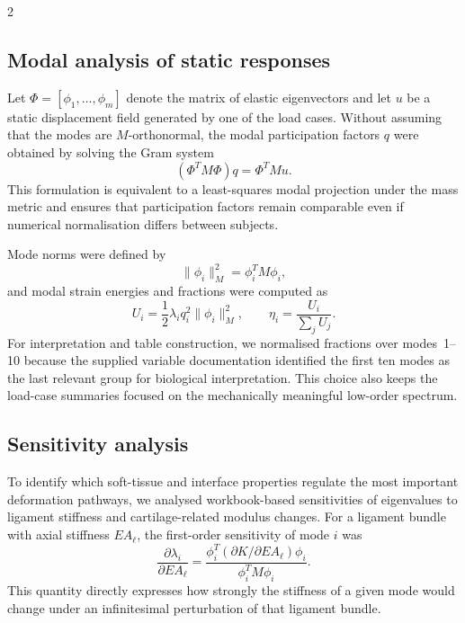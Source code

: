 \documentclass[openacc]{rsproca_new}
\begin{document}
\begin{multicols}{2}
\subsection{Modal analysis of static responses}

Let $\Phi=[\phi_{1},\ldots,\phi_{m}]$ denote the matrix of elastic eigenvectors and let $u$ be a static displacement field generated by one of the load cases. Without assuming that the modes are $M$-orthonormal, the modal participation factors $q$ were obtained by solving the Gram system
\begin{equation}
(\Phi^{T}M\Phi)q=\Phi^{T}Mu.
\end{equation}
This formulation is equivalent to a least-squares modal projection under the mass metric and ensures that participation factors remain comparable even if numerical normalisation differs between subjects.

Mode norms were defined by
\begin{equation}
\|\phi_{i}\|_{M}^{2}=\phi_{i}^{T}M\phi_{i},
\end{equation}
and modal strain energies and fractions were computed as
\begin{equation}
U_{i}=\frac{1}{2}\lambda_{i}q_{i}^{2}\|\phi_{i}\|_{M}^{2}, \qquad
\eta_{i}=\frac{U_{i}}{\sum_{j}U_{j}}.
\end{equation}
For interpretation and table construction, we normalised fractions over modes~1--10 because the supplied variable documentation identified the first ten modes as the last relevant group for biological interpretation. This choice also keeps the load-case summaries focused on the mechanically meaningful low-order spectrum.

\subsection{Sensitivity analysis}

To identify which soft-tissue and interface properties regulate the most important deformation pathways, we analysed workbook-based sensitivities of eigenvalues to ligament stiffness and cartilage-related modulus changes. For a ligament bundle with axial stiffness $EA_{\ell}$, the first-order sensitivity of mode $i$ was
\begin{equation}
\frac{\partial \lambda_{i}}{\partial EA_{\ell}}
=
\frac{\phi_{i}^{T}\left(\partial K/\partial EA_{\ell}\right)\phi_{i}}
{\phi_{i}^{T}M\phi_{i}}.
\end{equation}
This quantity directly expresses how strongly the stiffness of a given mode would change under an infinitesimal perturbation of that ligament bundle.


\end{multicols}
\end{document}
